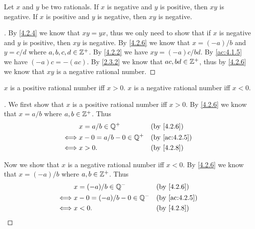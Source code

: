 \begin{ac}\label{ac:4.2.8}
  Let \(x\) and \(y\) be two rationals.
  If \(x\) is negative and \(y\) is positive, then \(xy\) is negative.
  If \(x\) is positive and \(y\) is negative, then \(xy\) is negative.
\end{ac}

\begin{proof}[]
  By \cref{4.2.4} we know that \(xy = yx\), thus we only need to show that if \(x\) is negative and \(y\) is positive, then \(xy\) is negative.
  By \cref{4.2.6} we know that \(x = (-a) / b\) and \(y = c / d\) where \(a, b, c, d \in \mathbb{Z}^+\).
  By \cref{4.2.2} we have \(xy = (-a)c / bd\).
  By \cref{ac:4.1.5} we have \((-a)c = -(ac)\).
  By \cref{2.3.2} we know that \(ac, bd \in \mathbb{Z}^+\), thus by \cref{4.2.6} we know that \(xy\) is a negative rational number.
\end{proof}

\begin{ac}\label{ac:4.2.9}
  \(x\) is a positive rational number iff \(x > 0\).
  \(x\) is a negative rational number iff \(x < 0\).
\end{ac}

\begin{proof}[]
  We first show that \(x\) is a positive rational number iff \(x > 0\).
  By \cref{4.2.6} we know that \(x = a / b\) where \(a, b \in \mathbb{Z}^+\).
  Thus
  \begin{align*}
         & x = a / b \in \Q^+         &  & \by{4.2.6}    \\
    \iff & x - 0 = a / b - 0 \in \Q^+ &  & \by{ac:4.2.5} \\
    \iff & x > 0.                     &  & \by{4.2.8}
  \end{align*}

  Now we show that \(x\) is a negative rational number iff \(x < 0\).
  By \cref{4.2.6} we know that \(x = (-a) / b\) where \(a, b \in \mathbb{Z}^+\).
  Thus
  \begin{align*}
         & x = (-a) / b \in \Q^-         &  & \by{4.2.6}    \\
    \iff & x - 0 = (-a) / b - 0 \in \Q^- &  & \by{ac:4.2.5} \\
    \iff & x < 0.                        &  & \by{4.2.8}
  \end{align*}
\end{proof}

